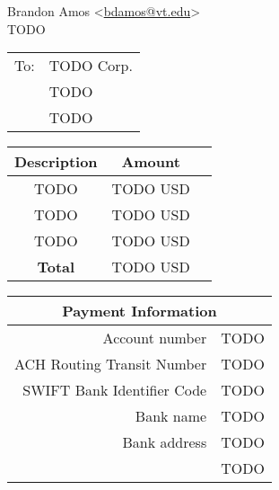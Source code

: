 \documentclass[12pt]{article}
\begin{document}
\begin{flushright}
  Brandon Amos <\url{bdamos@vt.edu}> \\
  TODO
\end{flushright}

\begin{tabular}{rl}
To: & TODO Corp. \\
    & TODO \\
    & TODO
\end{tabular}

\vspace{2\parskip}

\begin{tabular}{ccc}
  Description & Amount \\ \hline
  TODO & TODO USD \\ \hline
  TODO & TODO USD \\ \hline
  TODO & TODO USD \\ \hline
  \hfill {\bf Total} & TODO USD
\end{tabular}

\vspace{2\parskip}

\begin{tabular}{rl}
  \multicolumn{2}{c}{\bf Payment Information} \\ \hline
  Account number & TODO \\
  ACH Routing Transit Number & TODO \\
  SWIFT Bank Identifier Code & TODO \\
  Bank name & TODO \\
  Bank address & TODO \\
               & TODO
\end{tabular}
\end{document}
